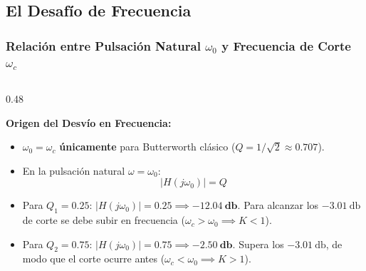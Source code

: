 \documentclass[aspectratio=169, 10pt]{beamer}
\begin{document}

\subsection{El Desafío de Frecuencia}
\begin{frame}
  \frametitle{Relación entre Pulsación Natural $\omega_0$ y Frecuencia de Corte $\omega_c$}

  \begin{columns}[t, onlytextwidth]
    \begin{column}{0.48\textwidth}
      \begin{tarjeta}
        {\fontsize{9pt}{11pt}\selectfont \textbf{\color{AlertAmber} Origen del Desvío en Frecuencia:}}\\[2pt]
        {\fontsize{8pt}{10pt}\selectfont
        \begin{itemize}\setlength{\itemsep}{2.5pt}
          \item $\omega_0 = \omega_c$ \textbf{únicamente} para Butterworth clásico ($Q = 1/\sqrt{2} \approx 0.707$).
          \item En la pulsación natural $\omega = \omega_0$:
          \[ |H(j\omega_0)| = Q \]
          \item Para $Q_1 = 0.25$: $|H(j\omega_0)| = 0.25 \implies \mathbf{-12.04\ \unit{\decibel}}$.
          Para alcanzar los $\qty{-3.01}{\decibel}$ de corte se debe subir en frecuencia ($\omega_c > \omega_0 \implies K < 1$).
          \item Para $Q_2 = 0.75$: $|H(j\omega_0)| = 0.75 \implies \mathbf{-2.50\ \unit{\decibel}}$.
          Supera los $\qty{-3.01}{\decibel}$, de modo que el corte ocurre antes ($\omega_c < \omega_0 \implies K > 1$).
        \end{itemize}
        }
      \end{tarjeta}
    \end{column}


\end{columns}
\end{frame}
\end{document}
